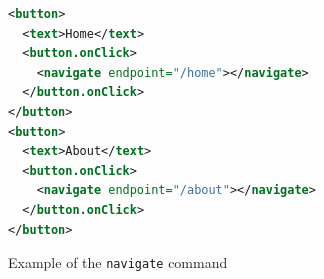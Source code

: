 \begin{figure}
\begin{minipage}{\linewidth}
\begin{lstlisting}[language=xml]
<button>
  <text>Home</text>
  <button.onClick>
    <navigate endpoint="/home"></navigate>
  </button.onClick>
</button>
<button>
  <text>About</text>
  <button.onClick>
    <navigate endpoint="/about"></navigate>
  </button.onClick>
</button>
\end{lstlisting}
\end{minipage}
\caption{Example of the \texttt{navigate} command}%
\label{fig:navigate_usage}%
\end{figure}